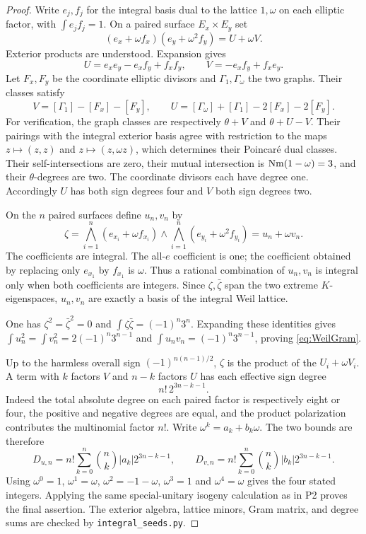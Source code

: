 \begin{proof}
Write $e_j,f_j$ for the integral basis dual to the lattice $1,\omega$ on each elliptic factor, with $\int e_jf_j=1$. On a paired surface $E_x\times E_y$ set
\[
 (e_x+\omega f_x)(e_y+\omega^2 f_y)=U+\omega V.
\]
Exterior products are understood. Expansion gives
\[
 U=e_xe_y-e_xf_y+f_xf_y,\qquad V=-e_xf_y+f_xe_y.
\]
Let $F_x,F_y$ be the coordinate elliptic divisors and $\Gamma_1,\Gamma_\omega$ the two graphs. Their classes satisfy
\[
 V=[\Gamma_1]-[F_x]-[F_y],\qquad
 U=[\Gamma_\omega]+[\Gamma_1]-2[F_x]-2[F_y].
\]
For verification, the graph classes are respectively $\theta+V$ and $\theta+U-V$. Their pairings with the integral exterior basis agree with restriction to the maps $z\mapsto(z,z)$ and $z\mapsto(z,\omega z)$, which determines their Poincar\'e dual classes. Their self-intersections are zero, their mutual intersection is $\operatorname{Nm}(1-\omega)=3$, and their $\theta$-degrees are two. The coordinate divisors each have degree one. Accordingly $U$ has both sign degrees four and $V$ both sign degrees two.

On the $n$ paired surfaces define $u_n,v_n$ by
\[
 \zeta=\bigwedge_{i=1}^n(e_{x_i}+\omega f_{x_i})
        \wedge\bigwedge_{i=1}^n(e_{y_i}+\omega^2f_{y_i})
       =u_n+\omega v_n.
\]
The coefficients are integral. The all-$e$ coefficient is one; the coefficient obtained by replacing only $e_{x_1}$ by $f_{x_1}$ is $\omega$. Thus a rational combination of $u_n,v_n$ is integral only when both coefficients are integers. Since $\zeta,\bar\zeta$ span the two extreme $K$-eigenspaces, $u_n,v_n$ are exactly a basis of the integral Weil lattice.

One has $\zeta^2=\bar\zeta^2=0$ and $\int\zeta\bar\zeta=(-1)^n3^n$. Expanding these identities gives
$\int u_n^2=\int v_n^2=2(-1)^n3^{n-1}$ and $\int u_nv_n=(-1)^n3^{n-1}$, proving \eqref{eq:WeilGram}.

Up to the harmless overall sign $(-1)^{n(n-1)/2}$, $\zeta$ is the product of the $U_i+\omega V_i$. A term with $k$ factors $V$ and $n-k$ factors $U$ has each effective sign degree
\[
 n!\,2^{3n-k-1}.
\]
Indeed the total absolute degree on each paired factor is respectively eight or four, the positive and negative degrees are equal, and the product polarization contributes the multinomial factor $n!$. Write $\omega^k=a_k+b_k\omega$. The two bounds are therefore
\[
 D_{u,n}=n!\sum_{k=0}^n\binom nk|a_k|2^{3n-k-1},\qquad
 D_{v,n}=n!\sum_{k=0}^n\binom nk|b_k|2^{3n-k-1}.
\]
Using $\omega^0=1$, $\omega^1=\omega$, $\omega^2=-1-\omega$, $\omega^3=1$ and $\omega^4=\omega$ gives the four stated integers. Applying the same special-unitary isogeny calculation as in P2 proves the final assertion. The exterior algebra, lattice minors, Gram matrix, and degree sums are checked by \texttt{integral\_seeds.py}.
\end{proof}

